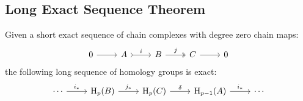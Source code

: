 \subsection{Long Exact Sequence Theorem}

\begin{theorem}
\label{thm:long-exact-sequence}
Given a short exact sequence of chain complexes with degree zero chain maps:
\[
\begin{tikzcd}
0 \ar[r]
&A \ar[r, tail, "i"]
&B \ar[r, two heads, "j"]
&C \ar[r]
&0
\end{tikzcd}
\]
the following long sequence of homology groups is exact:
\[
\begin{tikzcd}
\cdots \ar[r, "i_{*}"]
&\Hmlg_p(B) \ar[r, "j_{*}"]
&\Hmlg_p(C) \ar[r, "\delta"]
&\Hmlg_{p-1}(A) \ar[r, "i_{*}"]
&\cdots
\end{tikzcd}
\]
\end{theorem}

